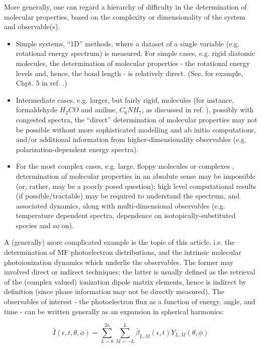 More generally, one can regard a hierarchy of difficulty in the determination of molecular properties, based on the complexity or dimensionality of the system and observable(s).
\begin{itemize}
\item Simple systems, ``1D” methods, where a dataset of a single variable (e.g. rotational energy spectrum) is measured. For simple cases, e.g. rigid diatomic molecules, the determination of molecular properties - the rotational energy levels and, hence, the bond length - is relatively direct. (See, for example, Chpt. 5 in ref. \cite{hollasHighRes}.) %
\item Intermediate cases, e.g. larger, but fairly rigid, molecules (for instance, formaldehyde $H_2CO$ and aniline, $C_6NH_7$, as discussed in ref. \cite{hollasHighRes}), possibly with congested spectra, the ``direct” determination of molecular properties may not be possible without more sophisticated modelling and ab initio computations, and/or additional information from higher-dimensionality observables (e.g. polarization-dependent energy spectra).
\item For the most complex cases, e.g. large, floppy molecules or complexes \cite{bunkerMolSymm,schmiedt2015SymmetryExtremelyFloppy}, determination of molecular properties in an absolute sense may be impossible (or, rather, may be a poorly posed question); high level computational results (if possible/tractable) may be required to understand the spectrum, and associated dynamics, along with multi-dimensional observables (e.g. temperature dependent spectra, dependence on isotopically-substituted species and so on).
\end{itemize}    

A (generally) more complicated example is the topic of this article, i.e. the determination of MF photoelectron distributions, and the intrinsic molecular photoionization dynamics which underlie the observables.  The former may involved direct or indirect techniques; the latter is usually defined as the retrieval of the (complex valued) ionization dipole matrix elements, hence is indirect by definition (since phase information may not be directly measured). The observables of interest - the photoelectron flux as a function of energy, angle, and time - can be written generally as an expansion in spherical harmonics:

\begin{equation}
\bar{I}(\epsilon,t,\theta,\phi)=\sum_{L=0}^{2n}\sum_{M=-L}^{L}\bar{\beta}_{L,M}(\epsilon,t)Y_{L,M}(\theta,\phi)\label{eq:AF-PAD-general}
\end{equation}

